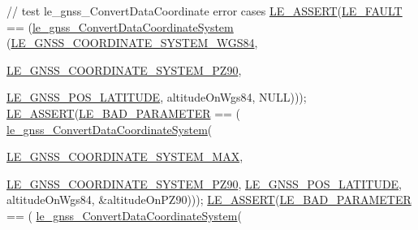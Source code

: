 \begin{DoxyCodeInclude}
{{{{    \textcolor{comment}{// test le\_gnss\_ConvertDataCoordinate error cases}
    \hyperlink{le__log_8h_ac0dbbef91dc0fed449d0092ff0557b39}{LE\_ASSERT}(\hyperlink{le__basics_8h_a1cca095ed6ebab24b57a636382a6c86cac409634423b6b1ef09643529f6224798}{LE\_FAULT} == (\hyperlink{le__gnss__interface_8h_af32fd94e35e4df94b65c84740c5dbf42}{le\_gnss\_ConvertDataCoordinateSystem}
      (\hyperlink{le__gnss__interface_8h_a8d401bb325c46681677bd273433565bea6211648c7f9b9c1e99c533d29033a618}{LE\_GNSS\_COORDINATE\_SYSTEM\_WGS84},
                                                               
      \hyperlink{le__gnss__interface_8h_a8d401bb325c46681677bd273433565beab88cd62cd5cb91159ea892a8f3444946}{LE\_GNSS\_COORDINATE\_SYSTEM\_PZ90},
                                                               
      \hyperlink{le__gnss__interface_8h_afd57bfce3570198fbcf0a98d81dab1c9a92d752c094ebf9bf61a56873e3077a54}{LE\_GNSS\_POS\_LATITUDE},
                                                               altitudeOnWgs84,
                                                               NULL)));
    \hyperlink{le__log_8h_ac0dbbef91dc0fed449d0092ff0557b39}{LE\_ASSERT}(\hyperlink{le__basics_8h_a1cca095ed6ebab24b57a636382a6c86cabe505065132f6e8850da6f476d8fb783}{LE\_BAD\_PARAMETER} == (
      \hyperlink{le__gnss__interface_8h_af32fd94e35e4df94b65c84740c5dbf42}{le\_gnss\_ConvertDataCoordinateSystem}(
                                                         
      \hyperlink{le__gnss__interface_8h_a8d401bb325c46681677bd273433565bea51798e45bcb46b8c0fa3757ee052078b}{LE\_GNSS\_COORDINATE\_SYSTEM\_MAX},
                                                         
      \hyperlink{le__gnss__interface_8h_a8d401bb325c46681677bd273433565beab88cd62cd5cb91159ea892a8f3444946}{LE\_GNSS\_COORDINATE\_SYSTEM\_PZ90},
                                                         \hyperlink{le__gnss__interface_8h_afd57bfce3570198fbcf0a98d81dab1c9a92d752c094ebf9bf61a56873e3077a54}{LE\_GNSS\_POS\_LATITUDE},
                                                         altitudeOnWgs84,
                                                         &altitudeOnPZ90)));
    \hyperlink{le__log_8h_ac0dbbef91dc0fed449d0092ff0557b39}{LE\_ASSERT}(\hyperlink{le__basics_8h_a1cca095ed6ebab24b57a636382a6c86cabe505065132f6e8850da6f476d8fb783}{LE\_BAD\_PARAMETER} == (
      \hyperlink{le__gnss__interface_8h_af32fd94e35e4df94b65c84740c5dbf42}{le\_gnss\_ConvertDataCoordinateSystem}(
                                                         
}}}}
\end{DoxyCodeInclude}
